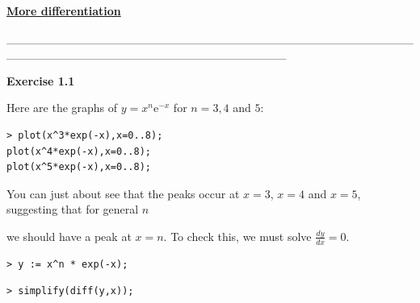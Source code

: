 \documentclass{article}
\begin{document}
\lstset{basicstyle=\ttfamily,breaklines=true,columns=flexible}
\pagestyle{empty}
\begin{center}
\begin{Maple Title}
\underline{\textbf{More differentiation}}
\end{Maple Title}
\end{center}
\begin{Maple Normal}
\_\_\_\_\_\_\_\_\_\_\_\_\_\_\_\_\_\_\_\_\_\_\_\_\_\_\_\_\_\_\_\_\_\_\_\_\_\_\_\_\_\_\_\_\_\_\_\_\_\_\_\_\_\_\_\_\_\_\_\_\_\_\_\_\_\_\_\_\_\_\_\_\_\_\_\_\_\_\_\_\_
\end{Maple Normal}
\begin{Maple Heading 2}
\textbf{Exercise 1.1}
\end{Maple Heading 2}
\begin{Maple Normal}
Here are the graphs of 
$y =x^{n} {\mathrm e}^{-x}$ for 
$n =3,4$ and 
$5$:
\end{Maple Normal}
\begin{lstlisting}
> plot(x^3*exp(-x),x=0..8);
plot(x^4*exp(-x),x=0..8);
plot(x^5*exp(-x),x=0..8);
\end{lstlisting}
\begin{Maple Normal}
You can just about see that the peaks occur at 
$x =3$, 
$x =4$ and 
$x =5$, suggesting that for general 
$n$ 
\end{Maple Normal}
\begin{Maple Normal}
we should have a peak at 
$x =n$.  To check this, we must solve 
$\frac{\mathit{dy}}{\mathit{dx}}=0$.
\end{Maple Normal}
\begin{lstlisting}
> y := x^n * exp(-x);
\end{lstlisting}
\begin{lstlisting}
> simplify(diff(y,x));
\end{lstlisting}
\end{document}
